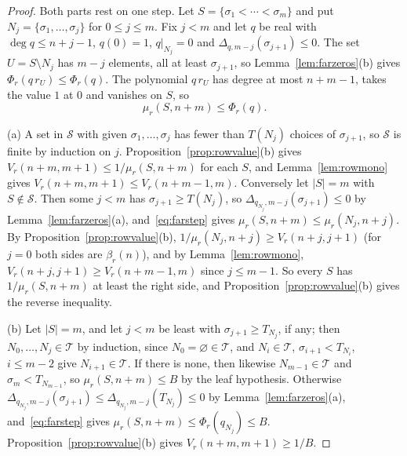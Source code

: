 \documentclass[11pt]{article}
\begin{document}
\begin{proof}
Both parts rest on one step.  Let $S=\{\sigma_1<\cdots<\sigma_m\}$ and
put $N_j=\{\sigma_1,\ldots,\sigma_j\}$ for $0\le j\le m$.  Fix $j<m$ and
let $q$ be real with $\deg q\le n+j-1$, $q(0)=1$, $q|_{N_j}=0$ and
$\Delta_{q,m-j}(\sigma_{j+1})\le0$.  The set
$U=S\setminus N_j$ has $m-j$ elements, all at least $\sigma_{j+1}$, so
Lemma~\ref{lem:farzeros}(b) gives $\Phi_r(q\,r_U)\le\Phi_r(q)$.  The
polynomial $q\,r_U$ has degree at most $n+m-1$, takes the value $1$ at $0$
and vanishes on $S$, so
\begin{equation}\label{eq:farstep}
  \mu_r(S,n+m)\le\Phi_r(q).
\end{equation}

(a) A set in $\mathcal S$ with given $\sigma_1,\ldots,\sigma_j$ has fewer
than $T(N_j)$ choices of $\sigma_{j+1}$, so $\mathcal S$ is finite by
induction on $j$.  Proposition~\ref{prop:rowvalue}(b) gives
$V_r(n+m,m+1)\le1/\mu_r(S,n+m)$ for each $S$, and Lemma~\ref{lem:rowmono}
gives $V_r(n+m,m+1)\le V_r(n+m-1,m)$.  Conversely let $|S|=m$ with
$S\notin\mathcal S$.  Then some $j<m$ has $\sigma_{j+1}\ge T(N_j)$, so
$\Delta_{q_{N_j},m-j}(\sigma_{j+1})\le0$ by Lemma~\ref{lem:farzeros}(a),
and~\eqref{eq:farstep} gives $\mu_r(S,n+m)\le\mu_r(N_j,n+j)$.  By
Proposition~\ref{prop:rowvalue}(b), $1/\mu_r(N_j,n+j)\ge V_r(n+j,j+1)$ (for
$j=0$ both sides are $\beta_r(n)$), and by Lemma~\ref{lem:rowmono},
$V_r(n+j,j+1)\ge V_r(n+m-1,m)$ since $j\le m-1$.  So every $S$ has
$1/\mu_r(S,n+m)$ at least the right side, and
Proposition~\ref{prop:rowvalue}(b) gives the reverse inequality.

(b) Let $|S|=m$, and let $j<m$ be least with $\sigma_{j+1}\ge T_{N_j}$, if
any; then $N_0,\ldots,N_j\in\mathcal T$ by induction, since
$N_0=\varnothing\in\mathcal T$, and $N_i\in\mathcal T$,
$\sigma_{i+1}<T_{N_i}$, $i\le m-2$ give $N_{i+1}\in\mathcal T$.  If there
is none, then likewise $N_{m-1}\in\mathcal T$ and $\sigma_m<T_{N_{m-1}}$,
so $\mu_r(S,n+m)\le B$ by the leaf hypothesis.  Otherwise
$\Delta_{q_{N_j},m-j}(\sigma_{j+1})\le\Delta_{q_{N_j},m-j}(T_{N_j})\le0$ by
Lemma~\ref{lem:farzeros}(a), and~\eqref{eq:farstep} gives
$\mu_r(S,n+m)\le\Phi_r(q_{N_j})\le B$.  Proposition~\ref{prop:rowvalue}(b)
gives $V_r(n+m,m+1)\ge1/B$.
\end{proof}
\end{document}
